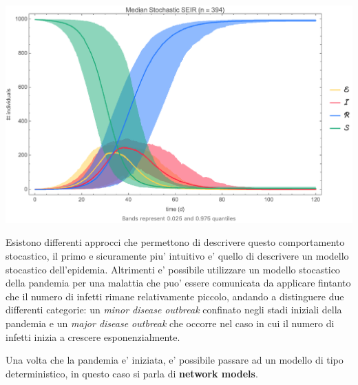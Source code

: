 \begin{minipage}{\linewidth}
    \centering
    \includegraphics[width=\textwidth]{img/stochastic_SEIR.png}
    \label{fig:stochastic_SEIR_model}
\end{minipage}

Esistono differenti approcci che permettono di descrivere questo comportamento stocastico, il primo e 
sicuramente piu' intuitivo e' quello di descrivere un modello stocastico dell'epidemia. Altrimenti e' possibile 
utilizzare un modello stocastico della pandemia per una malattia che puo' essere comunicata da applicare 
fintanto che il numero di infetti rimane relativamente piccolo, andando a distinguere due differenti categorie:
un \emph{minor disease outbreak} confinato negli stadi iniziali della pandemia e un 
\emph{major disease outbreak} che occorre nel caso in cui il numero di infetti inizia a crescere esponenzialmente.

Una volta che la pandemia e' iniziata, e' possibile passare ad un modello di tipo deterministico, in questo caso si 
parla di \textbf{network models}.